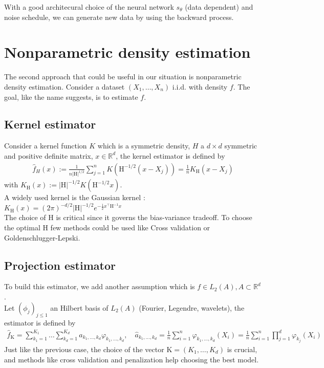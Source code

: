 \documentclass{article}
\begin{document}
With a good architecural choice of the neural network \(s_\theta\) (data dependent) and noise schedule, we can generate new data by using the backward process.


\section{Nonparametric density estimation}
The second approach that could be useful in our situation is nonparametric density estimation. Consider a dataset \((X_1,\ldots,X_n)\) i.i.d. with density \(f\). The goal, like the name suggests, is to estimate \(f\). 

\subsection{Kernel estimator}
Consider a kernel function \(K\) which is a symmetric density, \(H\) a \(d\times d\) symmetric and positive definite matrix, \(x\in\mathbb{R}^d\), the kernel estimator is defined by 
\begin{align}
\hat{f}_H(x):=\frac{1}{n|\mathrm{H}|^{1/2}}\sum_{j=1}^n K\left(\mathrm{H}^{-1/2}(x-X_j)\right)=\frac{1}{n}K_\mathrm{H}\left(x-X_j\right)
\end{align}
with \(K_\mathrm{H}(x):= |\mathrm{H}|^{-1/2}K(\mathrm{H}^{-1/2}x)\). \\
A widely used kernel is the Gaussian kernel : \(K_\textrm{H}(x)=(2\pi)^{-d/2}|\textrm{H}|^{-1/2}e^{-\frac{1}{2} x^\intercal \textrm{H}^{-1} x}\) \\
The choice of \(\mathrm{H}\) is critical since it governs the bias-variance tradeoff. To choose the optimal \(\mathrm{H}\) few methods could be used like Cross validation or Goldenschlugger-Lepski.

\subsection{Projection estimator}
To build this estimator, we add another assumption which is \(f\in L_2(A), A\subset \mathbb{R}^d\). \\
Let \((\phi_j)_{j\le 1}\) an Hilbert basis of \(L_2(A)\) (Fourier, Legendre, wavelets), the estimator is defined by 
\begin{align}
    \hat{f}_\mathrm{K}=\sum_{k_1=1}^{K_1}\ldots\sum_{k_d=1}^{K_d}\hat{a}_{k_1,\ldots,k_d}\varphi_{k_1,\ldots,k_d}, \quad \hat{a}_{k_1,\ldots,k_d}=\frac{1}{n}\sum_{i=1}^n \varphi_{k_1,\ldots,k_d}(X_i) = \frac{1}{n}\sum_{i=1}^n \prod_{j=1}^d \varphi_{k_j}(X_i)
\end{align}
Just like the previous case, the choice of the vector \(\mathrm{K}=(K_1,\ldots,K_d)\) is crucial, and methods like cross validation and penalization help choosing the best model.

\bigskip

\newpage
\nocite{Coste_2025}
\nocite{lipman2024flowmatchingguidecode}
\nocite{strasman2025analysisnoiseschedulescorebased}
\nocite{battey2014smoothprojecteddensityestimation}
\nocite{dionblanc2025nonparametricdensityestimation}


\end{document}

